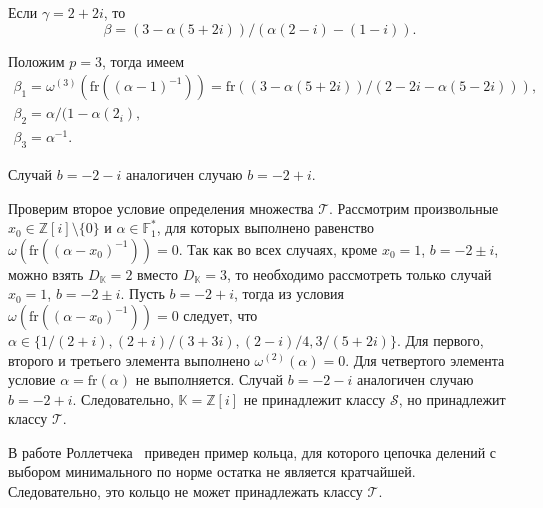 \documentclass[_00_dissertation.tex]{subfiles}
\begin{document}
\begin{example}
    Если $\gamma=2+2i$, то
    \begin{equation*}
        \beta=(3-\alpha(5+2i))/(\alpha(2-i)-(1-i)).
    \end{equation*}

    Положим $p=3$, тогда имеем
    \begin{equation*}
        \begin{array}{c}
            \beta_1=\omega^{(3)}(\textrm{fr}((\alpha-1)^{-1}))=\textrm{fr}((3-\alpha(5+2i))/(2-2i-\alpha(5-2i))),\\
            \beta_2=\alpha/(1-\alpha(2_i),\\
            \beta_3=\alpha^{-1}.
        \end{array}
    \end{equation*}

    Случай $b=-2-i$ аналогичен случаю $b=-2+i$.

    Проверим второе условие определения множества $\mathcal{T}$.
    Рассмотрим произвольные $x_0\in\mathbb{Z}[i]\setminus\{0\}$ и $\alpha\in\mathbb{F}^*_1$, для которых выполнено равенство $\omega(\textrm{fr}((\alpha-x_0)^{-1}))=0$.
    Так как во всех случаях, кроме $x_0=1$, $b=-2\pm i$, можно взять $D_{\mathbb{K}}=2$ вместо $D_{\mathbb{K}}=3$, то необходимо рассмотреть только случай $x_0=1$, $b=-2\pm i$.
    Пусть $b=-2+i$, тогда из условия $\omega(\textrm{fr}((\alpha-x_0)^{-1}))=0$ следует, что $\alpha\in\{1/(2+i),(2+i)/(3+3i),(2-i)/4,3/(5+2i)\}$.
    Для первого, второго и третьего элемента выполнено $\omega^{(2)}(\alpha)=0$.
    Для четвертого элемента условие $\alpha=\textrm{fr}(\alpha)$ не выполняется.
    Случай $b=-2-i$ аналогичен случаю $b=-2+i$.
    Следовательно, $\mathbb{K}=\mathbb{Z}[i]$ не принадлежит классу $\mathcal{S}$, но принадлежит классу $\mathcal{T}$.
\end{example}

В работе Роллетчека~\cite{source:Rolletschek_1990} приведен пример кольца, для которого цепочка делений с выбором минимального по норме остатка не является кратчайшей.
Следовательно, это кольцо не может принадлежать классу $\mathcal{T}$.
\end{document}
